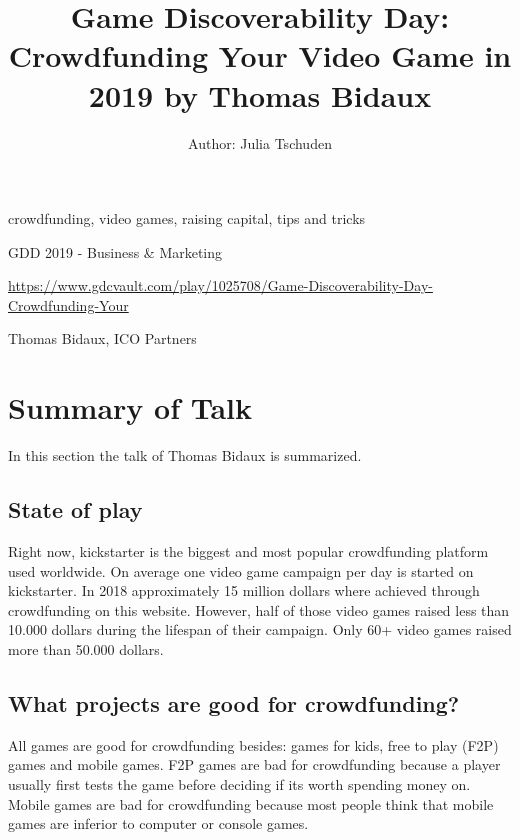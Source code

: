 \documentclass[a4paper]{article}
\title{Game Discoverability Day: Crowdfunding Your Video Game in 2019 by Thomas Bidaux}
\author{Author: Julia Tschuden}
\begin{document}
\maketitle

\begin{keywords} crowdfunding, video games, raising capital, tips and tricks \end{keywords}

\begin{track} GDD 2019 - Business \& Marketing \end{track}

\begin{talkurl} \url{https://www.gdcvault.com/play/1025708/Game-Discoverability-Day-Crowdfunding-Your} \end{talkurl}

\begin{speaker}Thomas Bidaux, ICO Partners \end{speaker}


\section{Summary of Talk}

In this section the talk of Thomas Bidaux is summarized.

\subsection{State of play}
Right now, kickstarter is the biggest and most popular crowdfunding platform used worldwide. On average one video game campaign per day is started on kickstarter. In 2018 approximately 15 million dollars where achieved through crowdfunding on this website. However, half of those video games raised less than 10.000 dollars during the lifespan of their campaign. Only 60+ video games raised more than 50.000 dollars.

\subsection{What projects are good for crowdfunding?}
All games are good for crowdfunding besides: games for kids, free to play (F2P) games and mobile games. F2P games are bad for crowdfunding because a player usually first tests the game before deciding if its worth spending money on. Mobile games are bad for crowdfunding because most people think that mobile games are inferior to computer or console games.
\end{document}
